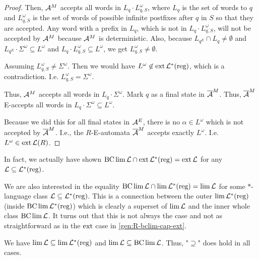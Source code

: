\begin{lemma}
\begin{proof}
Then, $\mathcal{A}^M$ accepts all words in $L_q \cdot L_{q,S}^\omega$, where $L_q$ is the set of words to $q$ and $L^\omega_{q,S}$ is the set of words of possible infinite postfixes after $q$ in $S$ so that they are accepted.
Any word with a prefix in $L_q$, which is not in $L_q \cdot L^\omega_{q,S}$, will not be accepted by $\mathcal{A}^M$ because $\mathcal{A}^M$ is deterministic. Also, because $L_{q^E} \cap L_q \neq \emptyset$ and $L_{q^E} \cdot \Sigma^\omega \subseteq L^\omega$ and $L_q \cdot L^\omega_{q,S} \subseteq L^\omega$, we get $L^\omega_{q,S} \neq \emptyset$.

Assuming $L^\omega_{q,S} \neq \Sigma^\omega$. Then we would have $L^\omega \not\in \operatorname{ext} \mathcal{L}^*(\text{reg})$, which is a contradiction. I.e. $L^\omega_{q,S} = \Sigma^\omega$.

Thus, $\mathcal{A}^M$ accepts all words in $L_q \cdot \Sigma^\omega$. Mark $q$ as a final state in $\overline{\mathcal{A}}^M$. Thus, $\overline{\mathcal{A}}^M$ E-accepts all words in $L_q \cdot \Sigma^\omega \subseteq L^\omega$.


Because we did this for all final states in $\mathcal{A}^E$, there is no $\alpha \in L^\omega$ which is not accepted by $\overline{\mathcal{A}}^M$. I.e., the $R$-E-automata $\overline{\mathcal{A}}^M$ accepts exactly $L^\omega$. I.e. $L^\omega \in \operatorname{ext} \mathcal{L}(R)$.
\end{proof}
\end{lemma}

In fact, we actually have shown $\operatorname{BC} \lim \mathcal{L} \cap \operatorname{ext} \mathcal{L}^*(\text{reg}) = \operatorname{ext} \mathcal{L}$ for any $\mathcal{L} \subseteq \mathcal{L}^*(\text{reg})$.


We are also interested in the equality $\operatorname{BC} \lim \mathcal{L} \cap \lim \mathcal{L}^*(\text{reg}) = \lim \mathcal{L}$ for some $*$-language class $\mathcal{L} \subseteq \mathcal{L}^*(\text{reg})$. This is a connection between the outer $\lim \mathcal{L}^*(\text{reg})$ (inside $\operatorname{BC} \lim \mathcal{L}^*(\text{reg})$) which is clearly a superset of $\lim \mathcal{L}$ and the inner whole class $\operatorname{BC} \lim \mathcal{L}$. It turns out that this is not always the case and not as straightforward as in the $\operatorname{ext}$ case in \cref{gen:R-bclim-cap-ext}.

We have $\lim \mathcal{L} \subseteq \lim \mathcal{L}^*(\text{reg})$ and $\lim \mathcal{L} \subseteq \operatorname{BC} \lim \mathcal{L}$. Thus, "$\supseteq$" does hold in all cases.

